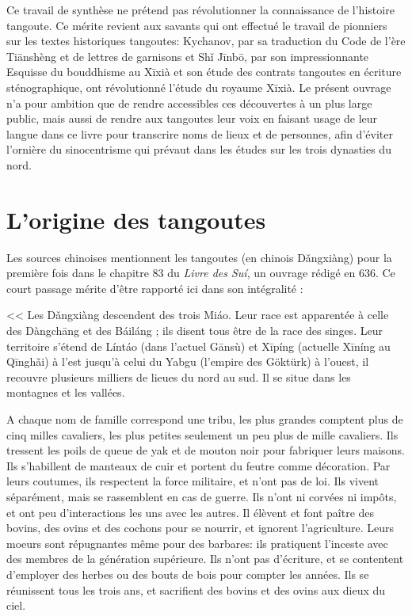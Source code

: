 \documentclass[oldfontcommands,oneside,a4paper,11pt]{memoir}
\newcommand{\ipa}[1]{{\phon #1}} %
\newcommand{\ipapl}[1]{{\phondroit #1}}
\newcommand{\ah}{\v{a}}
\newcommand{\ih}{\v{i}}
\begin{document}
Ce travail de synthèse ne prétend pas révolutionner la connaissance de l'histoire tangoute. Ce mérite revient aux savants qui ont effectué le travail de pionniers sur les textes historiques tangoutes: Kychanov, par sa traduction du \ipa{Code de l'ère Tiānshèng} et de lettres de garnisons et Sh\ih{} Jīnbō, par son impressionnante \ipa{Esquisse du bouddhisme au Xīxià} et son étude des contrats tangoutes en écriture sténographique, ont révolutionné l'étude du royaume Xīxià. Le présent ouvrage n'a pour ambition que de rendre accessibles ces découvertes à un plus large public, mais aussi de rendre aux tangoutes leur voix en faisant usage de leur langue dans ce livre pour transcrire noms de lieux et de personnes, afin d'éviter l'ornière du sinocentrisme qui prévaut dans les études sur les trois dynasties du nord.

\chapter{L'origine des tangoutes} 
Les sources chinoises mentionnent les tangoutes (en chinois \ipapl{Dǎngxiàng}) pour la première fois dans le chapitre 83 du \textit{Livre des Suí}, un ouvrage rédigé en 636. Ce court passage mérite d'être rapporté ici dans son intégralité :

<<
Les  \ipapl{Dǎngxiàng} descendent des trois \ipapl{Miáo}. Leur race est apparentée à celle des \ipapl{Dàngchāng} et des \ipapl{Báiláng} ; ils disent tous être de la race des singes. Leur territoire s'étend de Líntáo (dans l'actuel Gānsù) et Xīpíng (actuelle Xīníng au Qīngh\ah{}i) à l'est jusqu'à celui du Yabgu (l'empire des Göktürk) à l'ouest, il recouvre plusieurs milliers de lieues du nord au sud. Il se situe dans les montagnes et les vallées. 

A chaque nom de famille correspond une tribu, les plus grandes comptent plus de cinq milles cavaliers, les plus petites seulement un peu plus de mille cavaliers. Ils tressent les poils de queue de yak et de mouton noir pour  fabriquer leurs maisons. Ils s'habillent de manteaux de cuir et portent du feutre comme décoration. Par leurs coutumes, ils respectent la force militaire, et n'ont pas de loi. Ils vivent séparément, mais se rassemblent en cas de guerre. Ils n'ont ni corvées ni impôts, et ont peu d'interactions les uns avec les autres. Il élèvent et font paître des bovins, des ovins et des cochons pour se nourrir, et ignorent l'agriculture. Leurs moeurs sont répugnantes même pour des barbares: ils pratiquent l'inceste avec des membres de la génération supérieure. Ils n'ont pas d'écriture, et se contentent d'employer des herbes ou des bouts de bois pour compter les années. Ils se réunissent tous les trois ans, et sacrifient des bovins et des ovins aux dieux du ciel.
\end{document}
